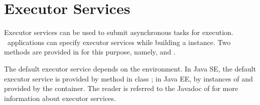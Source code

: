 \section{Executor Services}
\label{executor_services}

Executor services can be used to submit asynchronous tasks for execution. \jaxrs\ applications can specify executor services while building a  instance. Two methods are provided in  for this purpose, namely,  and . 

The default executor service depends on the environment. In Java SE, the default executor service is provided by method  in class ; in Java EE, by instances of  and  provided by the container. The reader is referred to the Javadoc of  for more information about executor services.

